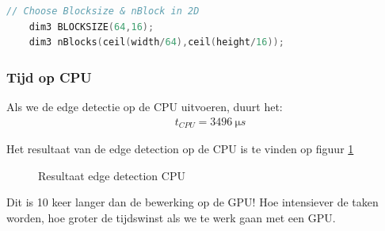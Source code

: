 \documentclass[11pt,twoside,a4paper]{article}
\begin{document}
\begin{lstlisting}[language=C, caption=Keuze Blocksize en nBlock, frame=single]
	// Choose Blocksize & nBlock in 2D
	dim3 BLOCKSIZE(64,16);
	dim3 nBlocks(ceil(width/64),ceil(height/16));
\end{lstlisting}\label{listing1}


\subsubsection{Tijd op CPU}
Als we de edge detectie op de CPU uitvoeren, duurt het:
\begin{align*}
    &t_{CPU} = \SI{3496}{\micro s}
\end{align*}

Het resultaat van de edge detection op de CPU is te vinden op figuur \ref{fig:edge_dection_cpu}
\begin{figure}[h!]
    \centering
    \hfill
    \caption{Resultaat edge detection CPU}
    \label{fig:edge_dection_cpu}
\end{figure}

Dit is 10 keer langer dan de bewerking op de GPU! Hoe intensiever de taken worden, hoe groter de tijdswinst als we te werk gaan met een GPU.
\end{document}

